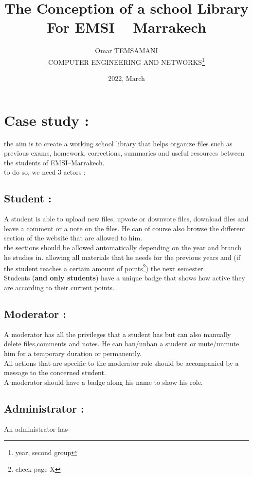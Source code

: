 \documentclass{article}
\begin{document}
\title{The Conception of a school Library For EMSI -- Marrakech}
\date{2022, March}
\author{Omar TEMSAMANI\\COMPUTER ENGINEERING AND NETWORKS\thanks{ year, second group}}
\maketitle
\section{Case study : }
\raggedright
\quad \quad the aim is to create a working school library that helps organize files such as previous exams, homework, corrections, summaries and useful resources between the students of EMSI--Marrakech. \\
to do so, we need 3 actors : 
\subsection{Student : }
\quad \quad A student is able to upload new files, upvote or downvote files, download files and leave a comment or a note on the files. He can of course also browse the different section of the website that are allowed to him.\\
\quad \quad the sections should be allowed automatically depending on the year and branch he studies in. allowing all materials that he needs for the previous years and (if the student reaches a certain amount of points\footnote{check page X}) the next semester.\\
\quad \quad Students (\textbf{and only students}) have a unique badge that shows how active they are according to their current points.
\subsection{Moderator : }
\quad \quad A moderator has all the privileges that a student has but can also manually delete files,comments and notes. He can ban/unban a student or mute/unmute him for a temporary duration or permanently.\\

\quad \quad All actions that are specific to the moderator role should be accompanied by a message to the concerned student.\\
\quad \quad A moderator should have a badge along his name to show his role.
\subsection{Administrator : }
\quad \quad An administrator has 
\end{document}
